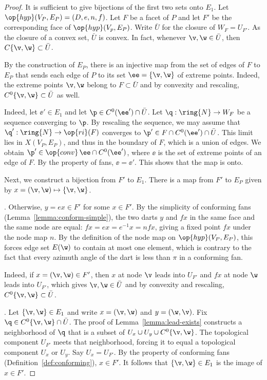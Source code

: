 \begin{proof}
  It is sufficient to give bijections of the first two sets onto
  $E_1$.  Let $\op{hyp}(V_P,E_P) = (D,e,n,f)$.  Let $F$ be a facet of
  $P$ and let $F'$ be the corresponding face of
  $\op{hyp}(V_p,E_P)$. Write $\bar U$ for the closure of
  $W_{F}=U_{F'}$.  As the closure of a convex set, $\bar U$ is convex.
  In fact, whenever $\v,\w\in \bar U$, then $C\{\v,\w\}\subset \bar
  U$.

  By the construction of $E_P$, there is an injective map from the set
  of edges of $F$ to $E_P$ that sends each edge of $P$ to its set
  $\ee =\{\v,\w\}$ of extreme points.    Indeed, the extreme points 
  $\v,\w$ belong to $F\subset\bar U$ and by convexity and rescaling,
  $C^0\{\v,\w\}\subset\bar U$ as well.

    Indeed, let
  $\ee'\in E_1$ and let $\p\in C^0(\ee')\cap\bar U$.  Let
  $\q:\ring{N}\to W_{F}$ be a sequence converging to $\p$.  By
  rescaling the sequence, we may assume that $\q':\ring{N}\to
  \op{ri}(F)$ converges to $\p' \in F \cap C^0(\ee')\cap \bar U$.
  This limit lies in $X(V_P,E_P)$, and thus in the boundary of $F$,
  which is a union of edges.  We obtain $\p' \in\op{conv}\,\ee\cap
  C^0(\ee')$, where $\ee$ is the set of extreme points of an edge of
  $F$.  By the {} property of fans, $\ee = \ee'$.
  This shows that the map is onto.

  Next, we construct a bijection from $F'$ to $E_1$.  There is a map
  from $F'$ to $E_P$ given by $x = (\v,\w) \mapsto \{\v,\w\}$. 

  .  Otherwise, $y = e x\in F'$ for some
  $x\in F'$.  By the simplicity of conforming fans
  (Lemma~\ref{lemma:conform-simple}), the two darts $y$ and $f x$ in
  the same face and the same node are equal: $f x = e x = e^{-1} x = n
  f x$, giving a fixed point $f x$ under the node map $n$.  By the
  definition of the node map on $\op{hyp}(V_P,E_P)$, this forces edge
  set $E(\w)$ to contain at most one element, which is contrary to the
  fact that every azimuth angle of the dart is less than $\pi$ in a
  conforming fan.

    Indeed, if $x=(\v,\w)\in F'$,
  then $x$ at node $\v$ leads into $U_{F'}$ and $f x$ at node $\w$ leads
  into $U_{F'}$, which gives $\v,\w\in \bar U$ and by convexity and rescaling, 
  $C^0\{\v,\w\}\subset \bar U$.

  .
  Let $\{\v,\w\}\in E_1$ and write $x = (\v,\w)$ and $y = (\w,\v)$.
  Fix $\q\in C^0\{\v,\w\}\cap \bar U$.  The proof of
  Lemma~\ref{lemma:lead-exists} constructs a neighborhood of $\q$ that
  is a subset of $U_x\cup U_y\cup C^0\{\v,\w\}$.  The topological
  component $U_{F'}$ meets that neighborhood, forcing it to equal a
  topological component $U_x$ or $U_y$.  Say $U_x = U_{F'}$.  By the
  property  of conforming fans
  (Definition~\ref{def:conforming}), $x\in F'$. It follows that
  $\{\v,\w\}\in E_1$ is the image of $x\in F'$.
\end{proof}



